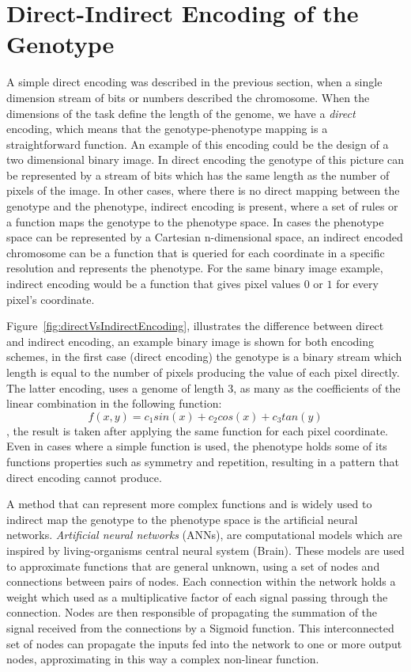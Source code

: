 \section{Direct-Indirect Encoding of the Genotype}
\label{DirectIndirect}

A simple direct encoding was described in the previous section, when a single dimension stream of bits or numbers described the chromosome. When the dimensions of the task define the length of the genome, we have a \emph{direct} encoding, which means that the genotype-phenotype mapping is a straightforward function. An example of this encoding could be the design of a two dimensional binary image. In direct encoding the genotype of this picture can be represented by a stream of bits which has the same length as the number of pixels of the image. In other cases, where there is no direct mapping between the genotype and the phenotype, indirect encoding is present, where a set of rules or a function maps the genotype to the phenotype space. In cases the phenotype space can be represented by a Cartesian n-dimensional space, an indirect encoded chromosome can be a function that is queried for each coordinate in a specific resolution and represents the phenotype. For the same binary image example, indirect encoding would be a function that gives pixel values $0$ or $1$ for every pixel's coordinate. 



Figure~\ref{fig:directVsIndirectEncoding}, illustrates the difference between direct and indirect encoding, an example binary image is shown for both encoding schemes, in the first case (direct encoding) the genotype is a binary stream which length is equal to the number of pixels producing the value of each pixel directly. The latter encoding, uses a genome of length 3, as many as the coefficients of the linear combination in the following function: 
\[f(x,y) = c_1 sin(x) + c_2 cos(x) + c_3 tan(y)
\], the result is taken after applying the same function for each pixel coordinate. Even in cases where a simple function is used, the  phenotype holds some of its functions properties such as symmetry and repetition, resulting in a pattern that direct encoding cannot produce.

A method that can represent more complex functions and is widely used to indirect map the genotype to the phenotype space is the artificial neural networks. \emph{Artificial neural networks} (ANNs), are computational models which are inspired by living-organisms central neural system (Brain). These models are used to approximate functions that are general unknown, using a set of nodes and connections between pairs of nodes. Each connection within the network holds a weight which used as a multiplicative factor of each signal passing through the connection. Nodes are then responsible of propagating the summation of the signal received from the connections by a Sigmoid function. This interconnected set of nodes can propagate the inputs fed into the network to one or more output nodes, approximating in this way a complex non-linear function.


